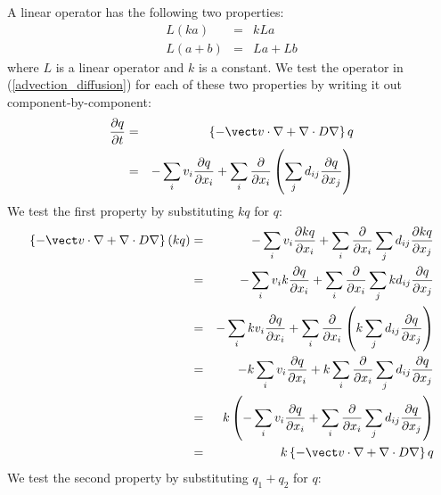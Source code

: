

\label{linearity}


A linear operator has the following two properties:
\begin{eqnarray}
	L(ka) & = & kLa \\
	L(a+b) & = & La + Lb
\end{eqnarray}
where $L$ is a linear operator and $k$ is a constant.
We test the operator in (\ref{advection_diffusion}) for each of these two
properties by writing it out component-by-component:
\begin{eqnarray}
	\frac{\partial q}{\partial t} & = & \left \lbrace -\vect v \cdot \nabla + \nabla \cdot D \nabla \right \rbrace q \\
				   & = & - \sum_i v_i \frac{\partial q}{\partial x_i} + \sum_i \frac{\partial}{\partial x_i} \left ( \sum_j d_{ij} \frac{\partial q}{\partial x_j} \right )
\end{eqnarray}
We test the first property by substituting $kq$ for $q$:
\begin{eqnarray}
	\left \lbrace -\vect v \cdot \nabla + \nabla \cdot D \nabla \right \rbrace (kq) & = & - \sum_i v_i \frac{\partial kq}{\partial x_i} + \sum_i \frac{\partial}{\partial x_i} \sum_j d_{ij} \frac{\partial kq}{\partial x_j} \\
	& = & - \sum_i v_i k \frac{\partial q}{\partial x_i} + \sum_i \frac{\partial}{\partial x_i} \sum_j k d_{ij} \frac{\partial q}{\partial x_j} \\
	& = & - \sum_i k v_i \frac{\partial q}{\partial x_i} + \sum_i \frac{\partial}{\partial x_i} \left ( k \sum_j d_{ij} \frac{\partial q}{\partial x_j} \right ) \\
	& = & - k \sum_i v_i \frac{\partial q}{\partial x_i} + k \sum_i \frac{\partial}{\partial x_i} \sum_j d_{ij} \frac{\partial q}{\partial x_j} \\
	& = & k \left ( - \sum_i v_i \frac{\partial q}{\partial x_i} + \sum_i \frac{\partial}{\partial x_i} \sum_j d_{ij} \frac{\partial q}{\partial x_j} \right ) \\
	& = & k \left \lbrace -\vect v \cdot \nabla + \nabla \cdot D \nabla \right \rbrace q
\end{eqnarray}
We test the second property by substituting $q_1 + q_2$ for $q$:
